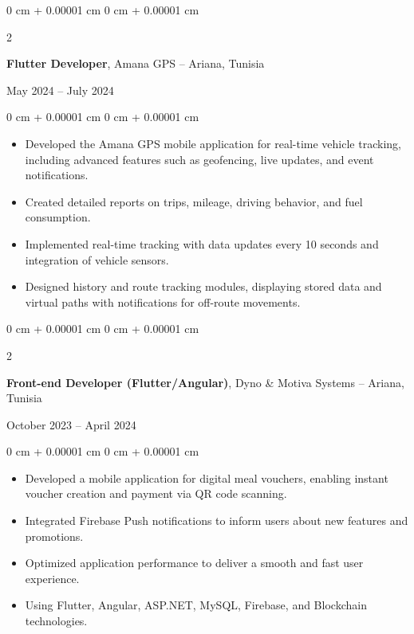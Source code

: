 \documentclass[10pt, letterpaper]{article}
\newenvironment{highlights}{
    \begin{itemize}[
        topsep=0.10 cm,
        parsep=0.10 cm,
        partopsep=0pt,
        itemsep=0pt,
        leftmargin=0 cm + 10pt
    ]
}{
    \end{itemize}
} %
\newenvironment{onecolentry}{
    \begin{adjustwidth}{
        0 cm + 0.00001 cm
    }{
        0 cm + 0.00001 cm
    }
}{
    \end{adjustwidth}
} %
\newenvironment{twocolentry}[2][]{
    \onecolentry
    \def\secondColumn{#2}
    \setcolumnwidth{\fill, 4.5 cm}
    \begin{paracol}{2}
}{
    \switchcolumn \raggedleft \secondColumn
    \end{paracol}
    \endonecolentry
} %
\begin{document}
        \begin{twocolentry}{
            May 2024 – July 2024
        }
            \textbf{Flutter Developer}, Amana GPS -- Ariana, Tunisia
        \end{twocolentry}
        
        \vspace{0.10 cm}
        \begin{onecolentry}
            \begin{highlights}
                \item Developed the Amana GPS mobile application for real-time vehicle tracking, including advanced features such as geofencing, live updates, and event notifications.
                \item Created detailed reports on trips, mileage, driving behavior, and fuel consumption.
                \item Implemented real-time tracking with data updates every 10 seconds and integration of vehicle sensors.
                \item Designed history and route tracking modules, displaying stored data and virtual paths with notifications for off-route movements.
            \end{highlights}
        \end{onecolentry}
        
        \vspace{0.2 cm}
        
        \begin{twocolentry}{
            October 2023 – April 2024
        }
        
            \textbf{Front-end Developer (Flutter/Angular)}, Dyno \& Motiva Systems -- Ariana, Tunisia
            
        \end{twocolentry}
        
        \vspace{0.10 cm}
        \begin{onecolentry}
            \begin{highlights}
                \item Developed a mobile application for digital meal vouchers, enabling instant voucher creation and payment via QR code scanning.
                \item Integrated Firebase Push notifications to inform users about new features and promotions.
                \item Optimized application performance to deliver a smooth and fast user experience.
                \item Using Flutter, Angular, ASP.NET, MySQL, Firebase, and Blockchain technologies.
            \end{highlights}
        \end{onecolentry}
        
\end{document}
